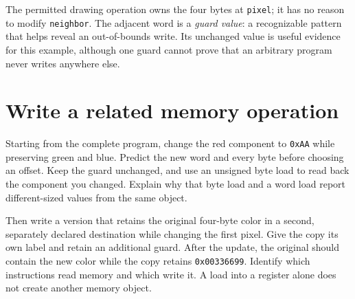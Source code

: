 The permitted drawing operation owns the four bytes at \texttt{pixel}; it has no
reason to modify \texttt{neighbor}. The adjacent word is a \emph{guard value}:
a recognizable pattern that helps reveal an out-of-bounds write. Its unchanged
value is useful evidence for this example, although one guard cannot prove that
an arbitrary program never writes anywhere else.

\section{Write a related memory operation}

Starting from the complete program, change the red component to \texttt{0xAA}
while preserving green and blue. Predict the new word and every byte before
choosing an offset. Keep the guard unchanged, and use an unsigned byte load to
read back the component you changed. Explain why that byte load and a word load
report different-sized values from the same object.

Then write a version that retains the original four-byte color in a second,
separately declared destination while changing the first pixel. Give the copy its
own label and retain an additional guard. After the update, the original should
contain the new color while the copy retains \texttt{0x00336699}. Identify which
instructions read memory and which write it. A load into a register alone does
not create another memory object.

